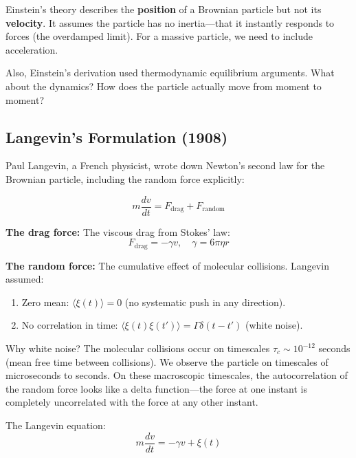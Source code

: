 \documentclass[11pt,a4paper]{article}
\begin{document}
	Einstein's theory describes the \textbf{position} of a Brownian particle but not its \textbf{velocity}. It assumes the particle has no inertia---that it instantly responds to forces (the overdamped limit). For a massive particle, we need to include acceleration.
	
	Also, Einstein's derivation used thermodynamic equilibrium arguments. What about the dynamics? How does the particle actually move from moment to moment?
	
	\subsection{Langevin's Formulation (1908)}
	
	Paul Langevin, a French physicist, wrote down Newton's second law for the Brownian particle, including the random force explicitly:
	
	\begin{equation}
		m \frac{dv}{dt} = F_{\text{drag}} + F_{\text{random}}
	\end{equation}
	
	\textbf{The drag force:} The viscous drag from Stokes' law:
	\begin{equation}
		F_{\text{drag}} = -\gamma v, \quad \gamma = 6\pi \eta r
	\end{equation}
	
	\textbf{The random force:} The cumulative effect of molecular collisions. Langevin assumed:
	\begin{enumerate}[label=(\arabic*)]
		\item Zero mean: $\langle \xi(t) \rangle = 0$ (no systematic push in any direction).
		\item No correlation in time: $\langle \xi(t) \xi(t') \rangle = \Gamma \delta(t - t')$ (white noise).
	\end{enumerate}
	
	Why white noise? The molecular collisions occur on timescales $\tau_c \sim 10^{-12}$ seconds (mean free time between collisions). We observe the particle on timescales of microseconds to seconds. On these macroscopic timescales, the autocorrelation of the random force looks like a delta function---the force at one instant is completely uncorrelated with the force at any other instant.
	
	The Langevin equation:
	\begin{equation}
		m \frac{dv}{dt} = -\gamma v + \xi(t)
	\end{equation}
	
\end{document}
